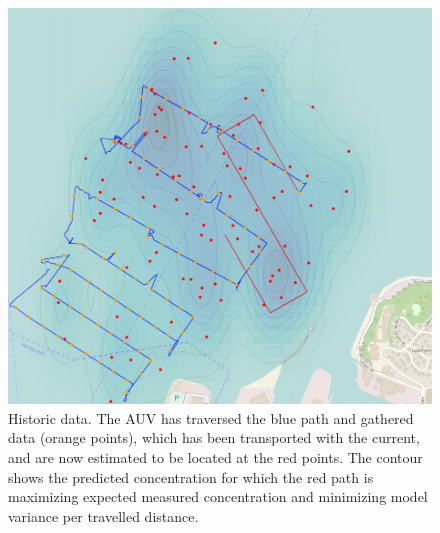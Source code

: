 \documentclass[conference]{IEEEtran}
\begin{document}
\begin{figure}[tbp]
  \centering
  \includegraphics[width=\linewidth]{figures/munkholmen_planned_path.png}
  \caption{Historic data. The AUV has traversed the blue path and
    gathered data (orange points), which has been transported with the
    current, and are now estimated to be located at the red points.
    The contour shows the predicted concentration for which the red
    path is maximizing expected measured concentration and minimizing
    model variance per travelled distance.}
  \label{fig:munkholmen}
\end{figure}
\end{document}
